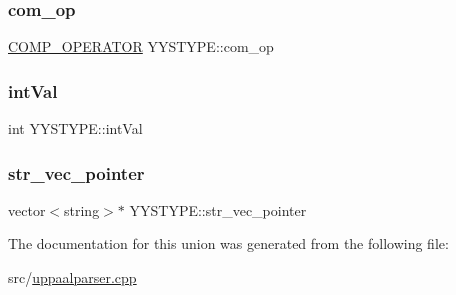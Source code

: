 \subsubsection{\texorpdfstring{com\_op}{com\_op}}
{\footnotesize\ttfamily \mbox{\hyperlink{namespacegraphsat_acfb5939f9bdafbd9aea0d084b9a56f69}{C\+O\+M\+P\+\_\+\+O\+P\+E\+R\+A\+T\+OR}} Y\+Y\+S\+T\+Y\+P\+E\+::com\+\_\+op}

\mbox{\label{union_y_y_s_t_y_p_e_a83ee412e29e20041c84ddb8ffa14b10c}} 
\subsubsection{\texorpdfstring{intVal}{intVal}}
{\footnotesize\ttfamily int Y\+Y\+S\+T\+Y\+P\+E\+::int\+Val}

\mbox{\label{union_y_y_s_t_y_p_e_a34f9f4734b6cc1f517f09040e563271e}} 
\subsubsection{\texorpdfstring{str\_vec\_pointer}{str\_vec\_pointer}}
{\footnotesize\ttfamily vector$<$string$>$$\ast$ Y\+Y\+S\+T\+Y\+P\+E\+::str\+\_\+vec\+\_\+pointer}



The documentation for this union was generated from the following file\+:\begin{DoxyCompactItemize}
\item 
src/\mbox{\hyperlink{uppaalparser_8cpp}{uppaalparser.\+cpp}}\end{DoxyCompactItemize}
